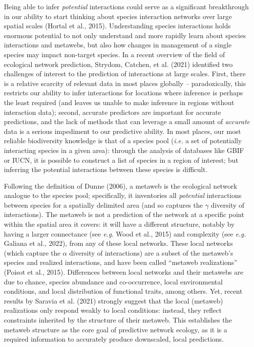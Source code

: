 \documentclass[10pt,oneside]{article}
\begin{document}
Being able to infer \emph{potential} interactions could serve as a
significant breakthrough in our ability to start thinking about species
interaction networks over large spatial scales (Hortal et al., 2015).
Understanding species interactions holds enormous potential to not only
understand and more rapidly learn about species interactions and
metawebs, but also how changes in management of a single species may
impact non-target species. In a recent overview of the field of
ecological network prediction, Strydom, Catchen, et al. (2021)
identified two challenges of interest to the prediction of interactions
at large scales. First, there is a relative scarcity of relevant data in
most places globally -- paradoxically, this restricts our ability to
infer interactions for locations where inference is perhaps the least
required (and leaves us unable to make inference in regions without
interaction data); second, accurate predictors are important for
accurate predictions, and the lack of methods that can leverage a small
amount of \emph{accurate} data is a serious impediment to our predictive
ability. In most places, our most reliable biodiversity knowledge is
that of a species pool (\emph{i.e.} a set of potentially interacting
species in a given area): through the analysis of databases like GBIF or
IUCN, it is possible to construct a list of species in a region of
interest; but inferring the potential interactions between these species
is difficult.

Following the definition of Dunne (2006), a metaweb is the ecological
network analogue to the species pool; specifically, it inventories all
\emph{potential} interactions between species for a spatially delimited
area (and so captures the \(\gamma\) diversity of interactions). The
metaweb is not a prediction of the network at a specific point within
the spatial area it covers: it will have a different structure, notably
by having a larger connectance (see \emph{e.g.} Wood et al., 2015) and
complexity (see \emph{e.g.} Galiana et al., 2022), from any of these
local networks. These local networks (which capture the \(\alpha\)
diversity of interactions) are a subset of the metaweb's species and
realized interactions, and have been called ``metaweb realizations''
(Poisot et al., 2015). Differences between local networks and their
metawebs are due to chance, species abundance and co-occurrence, local
environmental conditions, and local distribution of functional traits,
among others. Yet, recent results by Saravia et al. (2021) strongly
suggest that the local (metaweb) realizations only respond weakly to
local conditions: instead, they reflect constraints inherited by the
structure of their metaweb. This establishes the metaweb structure as
the core goal of predictive network ecology, as it is a required
information to accurately produce downscaled, local predictions.
\end{document}
